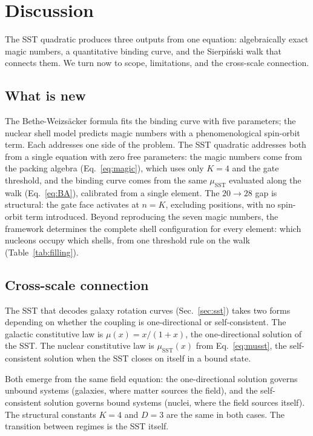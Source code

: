 \documentclass[fleqn,usenatbib]{mnras}
\begin{document}
\section{Discussion}
\label{sec:discussion}

The SST quadratic produces three outputs from one equation: algebraically exact magic numbers, a quantitative binding curve, and the Sierpi\'nski walk that connects them. We turn now to scope, limitations, and the cross-scale connection.

\subsection{What is new}

The Bethe-Weizs\"acker formula fits the binding curve with five parameters; the nuclear shell model predicts magic numbers with a phenomenological spin-orbit term. Each addresses one side of the problem. The SST quadratic addresses both from a single equation with zero free parameters: the magic numbers come from the packing algebra (Eq.~\ref{eq:magic}), which uses only $K = 4$ and the gate threshold, and the binding curve comes from the same $\mu_{\mathrm{SST}}$ evaluated along the walk (Eq.~\ref{eq:BA}), calibrated from a single element. The $20\!\to\!28$ gap is structural: the gate face activates at $n = K$, excluding positions, with no spin-orbit term introduced. Beyond reproducing the seven magic numbers, the framework determines the complete shell configuration for every element: which nucleons occupy which shells, from one threshold rule on the walk (Table~\ref{tab:filling}).

\subsection{Cross-scale connection}

The SST that decodes galaxy rotation curves (Sec.~\ref{sec:sst}) takes two forms depending on whether the coupling is one-directional or self-consistent. The galactic constitutive law is $\mu(x) = x/(1+x)$, the one-directional solution of the SST. The nuclear constitutive law is $\mu_{\mathrm{SST}}(x)$ from Eq.~\ref{eq:musst}, the self-consistent solution when the SST closes on itself in a bound state.

Both emerge from the same field equation: the one-directional solution governs unbound systems (galaxies, where matter sources the field), and the self-consistent solution governs bound systems (nuclei, where the field sources itself). The structural constants $K = 4$ and $D = 3$ are the same in both cases. The transition between regimes is the SST itself.
\end{document}
